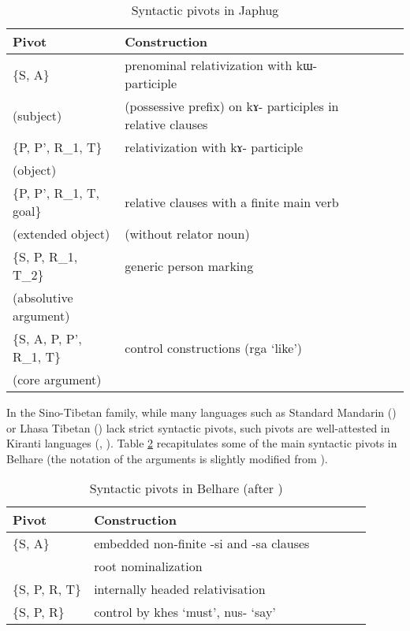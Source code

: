 \documentclass[oldfontcommands,oneside,a4paper,11pt]{article}
\newcommand{\ipa}[1]{{\phon #1}} %
\begin{document}
\begin{table}[H]
\caption{Syntactic pivots in Japhug} \label{tab:japhug.pivot} \centering
\begin{tabular}{llllll}
\toprule
Pivot & Construction \\
\midrule
\{S, A\}  & prenominal relativization with \ipa{kɯ-} participle  \\
 (subject)&(possessive prefix) on \ipa{kɤ-} participles in relative clauses \\
 \midrule
\{P, P', R_1, T\}  &relativization with \ipa{kɤ-} participle \\
(object)  & \\
\midrule
\{P, P', R_1, T, goal\} &
relative clauses with a finite main verb \\
(extended object) &(without relator noun)\\
\midrule
 \{S, P, R_1, T_2\} & generic person marking\\
 (absolutive argument)\\
 \midrule
  \{S, A, P, P', R_1, T\} & control constructions (\ipa{rga}  `like') \\
 (core argument)\\
\bottomrule
\end{tabular}
\end{table}

In the Sino-Tibetan family, while many languages such as Standard Mandarin (\citealt{lapolla93subject}) or Lhasa Tibetan  (\citealt{tournadre96erg}) lack strict syntactic pivots, such pivots are well-attested in Kiranti languages (\citealt{bickel01light.verbs}, \citealt{bickel04hidden}). Table \ref{tab:belhare} recapitulates some of the main syntactic pivots in Belhare (the notation of the arguments is slightly modified from \citealt{bickel04hidden}).

\begin{table}[H]
\caption{Syntactic pivots in Belhare (after \citealt{bickel04hidden})} \label{tab:belhare} \centering
\begin{tabular}{llllll}
\toprule
Pivot & Construction \\
\midrule
\{S, A\} & embedded non-finite \ipa{-si} and \ipa{-sa} clauses\\
& root nominalization\\
\{S, P, R, T\} & internally headed relativisation \\
\{S, P, R\} & control by \ipa{khes} `must', \ipa{nus-} `say'\\
\bottomrule
\end{tabular}
\end{table}
\end{document}
